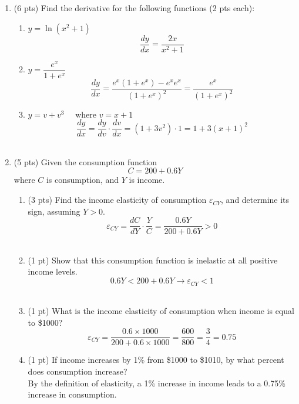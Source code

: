 \documentclass{./../../Latex/tests}
\begin{document}
\begin{enumerate}

\item (6 pts) Find the derivative for the following functions (2 pts each): \\
\begin{enumerate}
\item $y=\ln(x^2+1)$ \\ 
$$
\frac{d y}{d x}=\frac{2 x}{x^2+1}
$$ 
\item $y=\dfrac{e^x}{1+e^x}$ \\ 
$$\frac{d y}{d x} =\frac{e^x\left(1+e^x\right)-e^x e^x}{\left(1+e^x\right)^2} =\frac{e^x}{\left(1+e^x\right)^2} $$ 
\item $y=v+v^3 \quad \text{ where } v=x+1 $ \\ 
$$\frac{d y}{d x} =\frac{d y}{d v} \cdot \frac{d v}{d x} =\left(1+3 v^2\right) \cdot 1 =1+3(x+1)^2 $$ \\
\end{enumerate} 

\item (5 pts) Given the consumption function $$ C= 200+0.6Y  $$
where $C$ is consumption, and $Y$ is income. 
\begin{enumerate}
  \item (3 pts) Find the income elasticity of consumption $\varepsilon_{CY}$, and determine its sign, assuming $Y>0$. \\ 
 $$
\varepsilon_{CY}=\frac{d C}{d Y} \cdot \frac{Y}{C}=\frac{0.6 Y}{200+0.6 Y}>0 
$$ \\

  \item (1 pt) Show that this consumption function is inelastic at all positive income levels. 
  $$ 0.6 Y<200+0.6 Y \rightarrow \varepsilon_{CY}<1 $$ \\
  \item (1 pt) What is the income elasticity of consumption when income is equal to \$1000? 
$$
\varepsilon_{CY}=\frac{0.6 \times 1000}{200+0.6 \times 1000}=\frac{600}{800}=\frac{3}{4}=0.75
$$ 
  \item (1 pt) If income increases by 1\% from \$1000 to \$1010, by what percent does consumption increase? \\
  By the definition of elasticity, a 1\% increase in income leads to a 0.75\% increase in consumption. \\
\end{enumerate}


\end{enumerate}
\end{document}
